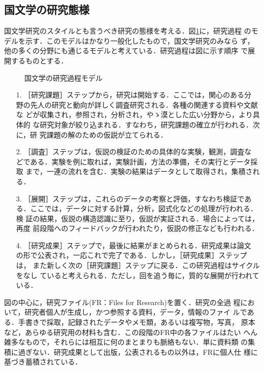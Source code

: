 \subsection{国文学の研究態様}
国文学研究のスタイルとも言うべき研究の態様を考える．図\ref{fig:1}に，研究過程
のモデルを示す．このモデルはかなり一般化したもので，国文学研究のみなら
ず，他の多くの分野にも通じるモデルと考えている．研究過程は図に示す順序
で展開するものとする．

\begin{figure}[htb]
\begin{center}
  
  \caption{国文学の研究過程モデル}\label{fig:1}
\end{center}
\end{figure}

\begin{itemize}
\item[1.] ［研究課題］ステップから，研究は開始する．ここでは，関心のある分
野の先人の研究と動向が詳しく調査研究される．各種の関連する資料や文献な
どが収集され，参照され，分析され，やゝ漠とした広い分野から，より具体的
な研究対象が絞り込まれる．すなわち，研究課題の確立が行われる．次に，研
究課題の解のための仮説が立てられる．
\item[2.] ［調査］ステップは，仮説の検証のための具体的な実験，観測，調査な
どである．実験を例に取れば，実験計画，方法の準備，その実行とデータ採取
まで，一連の流れを含む．実験の結果はデータとして取得され，集積される．
\item[3.] ［展開］ステップは，これらのデータの考察と評価，すなわち検証であ
る．ここでは，データに対する計算，分析，図式化などの処理が行われる．検
証の結果，仮説の構造認識に至り，仮説が実証される．場合によっては，再度
前段階へのフィードバックが行われたり，仮説の修正なども行われる．
\item[4.] ［研究成果］ステップで，最後に結果がまとめられる．研究成果は論文
の形で公表され，一応これで完了である．しかし，［研究成果］ステップは，
また新しく次の［研究課題］ステップに戻る．この研究過程はサイクルをなし
ていると考えられる．ただし，回を追う毎に，質的な展開が行われている．
\end{itemize}

図の中心に，研究ファイル(FR：Files for Research)を置く．研究の全過
程において，研究者個人が生成し，かつ参照する資料，データ，情報のファイ
ルである．手書きで採取，記録されたデータやメモ類，あるいは複写物，写真，
原本など，あらゆる研究用の材料も含む．この段階のFR中の各ファイルはたい
へん雑多なもので，それらには相互に何のまとまりも脈絡もない．単に資料類
の集積に過ぎない．研究成果として出版，公表されるもの以外は，FRに個人仕
様に基づき蓄積されている．

